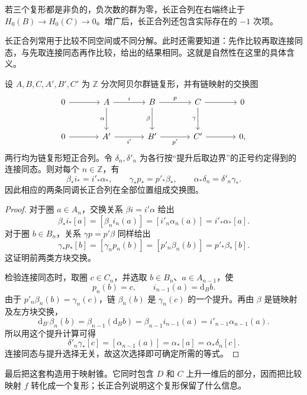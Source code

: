 若三个复形都是非负的，负次数的群为零，长正合列在右端终止于 \(H_0(B)\to H_0(C)\to0\)。增广后，长正合列还包含实际存在的 \(-1\) 次项。

长正合列常用于比较不同空间或不同分解。此时还需要知道：先作比较再取连接同态，与先取连接同态再作比较，给出的结果相同。这就是自然性在这里的具体含义。

\begin{proposition}\label{g2:prop:connecting-natural}
	设 \(A,B,C,A',B',C'\) 为 \(\mathbb Z\) 分次阿贝尔群链复形，并有链映射的交换图
	\[
		\begin{tikzcd}[column sep=large,row sep=large]
			0 \arrow[r] & A \arrow[r,"i"] \arrow[d,"\alpha"']
			& B \arrow[r,"p"] \arrow[d,"\beta"']
			& C \arrow[r] \arrow[d,"\gamma"'] & 0 \\
			0 \arrow[r] & A' \arrow[r,"i'"']
			& B' \arrow[r,"p'"'] & C' \arrow[r] & 0,
		\end{tikzcd}
	\]
	两行均为链复形短正合列。令 \(\delta_n,\delta'_n\) 为各行按“提升后取边界”的正号约定得到的连接同态。则对每个 \(n\in\mathbb Z\)，有
	\[
		\beta_*i_*=i'_*\alpha_*,
		\qquad
		\gamma_*p_*=p'_*\beta_*,
		\qquad
		\alpha_*\delta_n=\delta'_n\gamma_*.
	\]
	因此相应的两条同调长正合列在全部位置组成交换图。
\end{proposition}
\begin{proof}
	对于圈 \(a\in A_n\)，交换关系 \(\beta i=i'\alpha\) 给出
	\[
		\beta_*i_*[a]=[\beta_n i_n(a)]
		=[i'_n\alpha_n(a)]=i'_*\alpha_*[a].
	\]
	对于圈 \(b\in B_n\)，关系 \(\gamma p=p'\beta\) 同样给出
	\[
		\gamma_*p_*[b]=[\gamma_n p_n(b)]
		=[p'_n\beta_n(b)]=p'_*\beta_*[b].
	\]
	这证明前两类方块交换。

	检验连接同态时，取圈 \(c\in C_n\)，并选取 \(b\in B_n\)、\(a\in A_{n-1}\)，使
	\[
		p_n(b)=c,\qquad i_{n-1}(a)=\mathrm{d}_Bb.
	\]
	由于 \(p'_n\beta_n(b)=\gamma_n(c)\)，链 \(\beta_n(b)\) 是 \(\gamma_n(c)\) 的一个提升。再由 \(\beta\) 是链映射及左方块交换，
	\[
		\mathrm{d}_{B'}\beta_n(b)
		=\beta_{n-1}(\mathrm{d}_Bb)
		=\beta_{n-1}i_{n-1}(a)
		=i'_{n-1}\alpha_{n-1}(a).
	\]
	所以用这个提升计算可得
	\[
		\delta'_n\gamma_*[c]=[\alpha_{n-1}(a)]
		=\alpha_*[a]=\alpha_*\delta_n[c].
	\]
	连接同态与提升选择无关，故这次选择即可确定所需的等式。
\end{proof}

最后把这套构造用于映射锥。它同时包含 \(D\) 和 \(C\) 上升一维后的部分，因而把比较映射 \(f\) 转化成一个复形；长正合列说明这个复形保留了什么信息。

